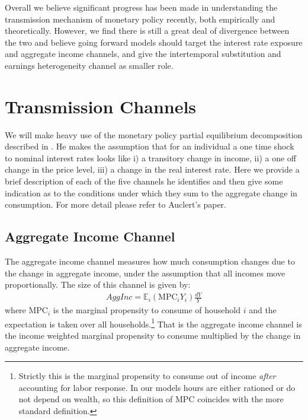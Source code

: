 \documentclass[titlepage]{\econtex}\newcommand{\texname}{ConsumptionHeterogeneity}
\begin{document}
Overall we believe significant progress has been made in understanding the transmission mechanism of monetary policy recently, both empirically and theoretically. However, we find there is still a great deal of divergence between the two and believe going forward models should target the interest rate exposure and aggregate income channels, and give the intertemporal substitution and earnings heterogeneity channel as smaller role.

\section{Transmission Channels} \label{transmission_channels}
We will make heavy use of the monetary policy partial equilibrium decomposition described in \cite{auclert_monetary_2017}. He makes the assumption that for an individual a one time shock to nominal interest rates looks like i) a transitory change in income, ii) a one off change in the price level, iii) a change in the real interest rate. Here we provide a brief description of each of the five channels he identifies and then give some indication as to the conditions under which they sum to the aggregate change in consumption. For more detail please refer to Auclert's paper.

\subsection{Aggregate Income Channel}
The aggregate income channel measures how much consumption changes due to the change in aggregate income, under the assumption that all incomes move proportionally. The size of this channel is given by:
\begin{align}
\textit{AggInc} = \mathbb{E}_i \left( \text{MPC}_i Y_i  \right) \frac{dY}{Y}
\end{align}
where $\text{MPC}_i$ is the marginal propensity to consume of household $i$ and the expectation is taken over all households.\footnote{Strictly this is the marginal propensity to consume out of income \textit{after} accounting for labor response. In our models hours are either rationed or do not depend on wealth, so this definition of MPC coincides with the more standard definition.} That is the aggregate income channel is the income weighted marginal propensity to consume multiplied by the change in aggregate income.
\end{document}
